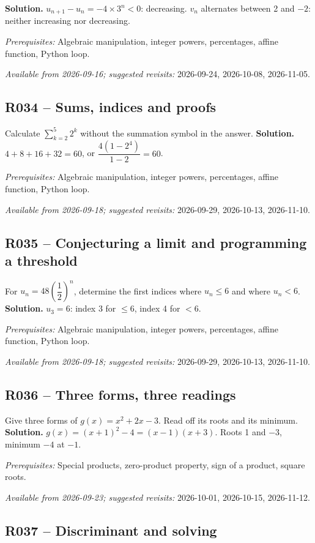 \ifmxteacher\textbf{Solution.} $u_{n+1}-u_n=-4\times3^n<0$: decreasing. $v_n$ alternates between 2 and $-2$: neither increasing nor decreasing.\par\textit{Prerequisites:} Algebraic manipulation, integer powers, percentages, affine function, Python loop.\par\textit{Available from 2026-09-16; suggested revisits:} 2026-09-24, 2026-10-08, 2026-11-05.\fi
{}\subsection*{R034 -- Sums, indices and proofs}\label{R034}
Calculate $\sum_{k=2}^{5}2^k$ without the summation symbol in the answer.
\ifmxteacher\textbf{Solution.} $4+8+16+32=60$, or $\dfrac{4(1-2^4)}{1-2}=60$.\par\textit{Prerequisites:} Algebraic manipulation, integer powers, percentages, affine function, Python loop.\par\textit{Available from 2026-09-18; suggested revisits:} 2026-09-29, 2026-10-13, 2026-11-10.\fi
{}\subsection*{R035 -- Conjecturing a limit and programming a threshold}\label{R035}
For $u_n=48(\dfrac{1}{2})^n$, determine the first indices where $u_n\leq6$ and where $u_n<6$.
\ifmxteacher\textbf{Solution.} $u_3=6$: index 3 for $\leq6$, index 4 for $<6$.\par\textit{Prerequisites:} Algebraic manipulation, integer powers, percentages, affine function, Python loop.\par\textit{Available from 2026-09-18; suggested revisits:} 2026-09-29, 2026-10-13, 2026-11-10.\fi
{}\subsection*{R036 -- Three forms, three readings}\label{R036}
Give three forms of $g(x)=x^2+2x-3$. Read off its roots and its minimum.
\ifmxteacher\textbf{Solution.} $g(x)=(x+1)^2-4=(x-1)(x+3)$. Roots 1 and $-3$, minimum $-4$ at $-1$.\par\textit{Prerequisites:} Special products, zero-product property, sign of a product, square roots.\par\textit{Available from 2026-09-23; suggested revisits:} 2026-10-01, 2026-10-15, 2026-11-12.\fi
{}\subsection*{R037 -- Discriminant and solving}\label{R037}
